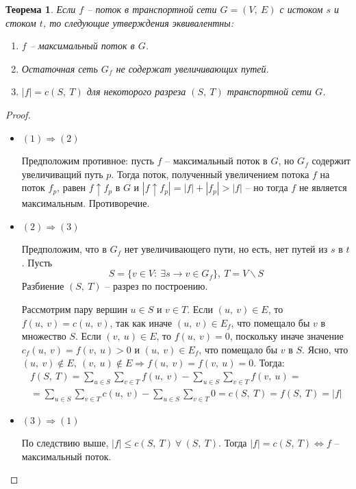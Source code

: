 \documentclass[a4paper,12pt]{article}
\newtheorem*{theorem}{Теорема}
\begin{document}
\begin{theorem}
Если $f$ -- поток в транспортной сети $G = (V,\ E)$ с истоком $s$ и стоком $t$, то следующие утверждения эквивалентны:
\begin{enumerate}
    \item $f$ -- максимальный поток в $G$.
    \item Остаточная сеть $G_f$ не содержат увеличивающих путей.
    \item $|f| = c(S,\ T)$ для некоторого разреза $(S,\ T)$ транспортной сети $G$.
\end{enumerate}
\end{theorem}
\begin{proof}
    \begin{itemize}
        \item $(1) \Rightarrow (2)$
        
        Предположим противное: пусть $f$ -- максимальный поток в $G$, но $G_f$ содержит увеличиващий путь $p$. Тогда поток, полученный увеличением потока $f$ на поток $f_p$, равен $f\uparrow f_p$ в $G$ и $|f \uparrow f_p|  = |f| + |f_p| > |f|$ -- но тогда $f$ не является максимальным. Противоречие.
        
        \item $(2) \Rightarrow (3)$
        
        Предположим, что в $G_f$ нет увеличивающего пути, но есть, нет путей из $s$ в $t$. Пусть \[S = \{v \in V :\ \exists s \to v \in G_f\},\ T = V\backslash S\] Разбиение $(S,\ T)$ -- разрез по построению.
        
        Рассмотрим пару вершин $u \in S$ и $v \in T$. Если $(u,\ v) \in E$, то $f(u,\ v) = c(u,\ v)$, так как иначе $(u,\ v) \in E_f$, что помещало бы $v$ в множество $S$. Если $(v,\ u) \in E$, то $f(u,\ v) = 0$, поскольку иначе значение $c_f(u,\ v) = f(v,\ u) > 0$ и $(u,\ v) \in E_f$, что помещало бы $v$ в $S$. Ясно, что $(u,\ v) \notin E,\ (v,\ u) \notin E \Rightarrow f(u,\ v) = f(v,\ u) = 0$. Тогда:
        \begin{gather*}
            f(S,\ T) = \sum\limits_{u \in S}\sum\limits_{v \in T}f(u,\ v) - \sum\limits_{u \in S}\sum\limits_{v \in T}f(v,\ u) =\\= \sum\limits_{u \in S}\sum\limits_{v \in T}c(u,\ v) - \sum\limits_{u \in S}\sum\limits_{v \in T}0 = c(S,\ T) = f(S,\ T) = |f|
        \end{gather*}
        \item $(3) \Rightarrow (1)$
        
        По следствию выше, $|f| \leqslant c(S,\ T)\ \forall\ (S,\ T)$. Тогда $|f| = c(S,\ T) \Longleftrightarrow f$ -- максимальный поток.
    \end{itemize}
\end{proof}
\newpage
\end{document}
